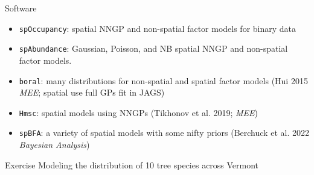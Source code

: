 \begin{frame}{Software}
   \begin{itemize}
        \item \texttt{spOccupancy}: spatial NNGP and non-spatial factor models for binary data
	\item \texttt{spAbundance}: Gaussian, Poisson, and NB spatial NNGP and non-spatial factor models.
	\item \texttt{boral}: many distributions for non-spatial and spatial factor models (Hui 2015 \textit{MEE}; spatial use full GPs fit in JAGS)
	\item \texttt{Hmsc}: spatial models using NNGPs (Tikhonov et al. 2019; \textit{MEE})
	\item \texttt{spBFA}: a variety of spatial models with some nifty priors (Berchuck et al. 2022 \textit{Bayesian Analysis})
   \end{itemize}
\end{frame}

\begin{frame}{Exercise}
	Modeling the distribution of 10 tree species across Vermont
\end{frame}


